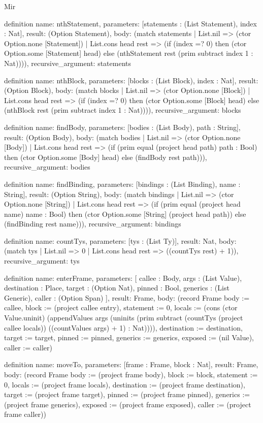 \begin{lexlean}{Mir}
\begin{semanticmodule}
definition{
  name: nthStatement,
  parameters: [statements : (List Statement), index : Nat],
  result: (Option Statement),
  body: (match statements
    | List.nil => (ctor Option.none [Statement])
    | List.cons head rest => (if (index =? 0) then (ctor Option.some [Statement] head) else (nthStatement rest (prim subtract index 1 : Nat)))),
  recursive_argument: statements
}

definition{
  name: nthBlock,
  parameters: [blocks : (List Block), index : Nat],
  result: (Option Block),
  body: (match blocks
    | List.nil => (ctor Option.none [Block])
    | List.cons head rest => (if (index =? 0) then (ctor Option.some [Block] head) else (nthBlock rest (prim subtract index 1 : Nat)))),
  recursive_argument: blocks
}

definition{
  name: findBody,
  parameters: [bodies : (List Body), path : String],
  result: (Option Body),
  body: (match bodies
    | List.nil => (ctor Option.none [Body])
    | List.cons head rest => (if (prim equal (project head path) path : Bool) then (ctor Option.some [Body] head) else (findBody rest path))),
  recursive_argument: bodies
}

definition{
  name: findBinding,
  parameters: [bindings : (List Binding), name : String],
  result: (Option String),
  body: (match bindings
    | List.nil => (ctor Option.none [String])
    | List.cons head rest => (if (prim equal (project head name) name : Bool) then (ctor Option.some [String] (project head path)) else (findBinding rest name))),
  recursive_argument: bindings
}

definition{
  name: countTys,
  parameters: [tys : (List Ty)],
  result: Nat,
  body: (match tys | List.nil => 0 | List.cons head rest => ((countTys rest) + 1)),
  recursive_argument: tys
}

definition{
  name: enterFrame,
  parameters: [
    callee : Body,
    args : (List Value),
    destination : Place,
    target : (Option Nat),
    pinned : Bool,
    generics : (List Generic),
    caller : (Option Span)
  ],
  result: Frame,
  body: (record Frame {body := callee, block := (project callee entry), statement := 0, locals := (cons (ctor Value.uninit) (appendValues args (uninits (prim subtract (countTys (project callee locals)) ((countValues args) + 1) : Nat)))), destination := destination, target := target, pinned := pinned, generics := generics, exposed := (nil Value), caller := caller})
}

definition{
  name: moveTo,
  parameters: [frame : Frame, block : Nat],
  result: Frame,
  body: (record Frame {body := (project frame body), block := block, statement := 0, locals := (project frame locals), destination := (project frame destination), target := (project frame target), pinned := (project frame pinned), generics := (project frame generics), exposed := (project frame exposed), caller := (project frame caller)})
}


\end{semanticmodule}
\end{lexlean}
